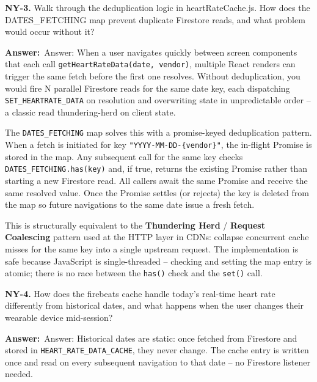\documentclass[letterpaper,10pt]{article}
\newlength{\boxwidth}
\newcommand{\answerlabel}{\noindent\textbf{\textcolor{answerblue}{Answer:}}~}
\begin{document}
\colorbox{qbg}{\begin{minipage}{\boxwidth}
\textbf{NY-3.} Walk through the deduplication logic in heartRateCache.js. How does the DATES\_FETCHING map prevent duplicate Firestore reads, and what problem would occur without it?
\end{minipage}}

\vspace{2pt}
\answerlabel{Answer:} When a user navigates quickly between screen components that each call \texttt{getHeartRateData(date, vendor)}, multiple React renders can trigger the same fetch before the first one resolves. Without deduplication, you would fire N parallel Firestore reads for the same date key, each dispatching \texttt{SET\_HEARTRATE\_DATA} on resolution and overwriting state in unpredictable order -- a classic read thundering-herd on client state.

The \texttt{DATES\_FETCHING} map solves this with a promise-keyed deduplication pattern. When a fetch is initiated for key \texttt{"YYYY-MM-DD-\{vendor\}"}, the in-flight Promise is stored in the map. Any subsequent call for the same key checks \texttt{DATES\_FETCHING.has(key)} and, if true, returns the existing Promise rather than starting a new Firestore read. All callers await the same Promise and receive the same resolved value. Once the Promise settles (or rejects) the key is deleted from the map so future navigations to the same date issue a fresh fetch.

This is structurally equivalent to the \textbf{Thundering Herd} / \textbf{Request Coalescing} pattern used at the HTTP layer in CDNs: collapse concurrent cache misses for the same key into a single upstream request. The implementation is safe because JavaScript is single-threaded -- checking and setting the map entry is atomic; there is no race between the \texttt{has()} check and the \texttt{set()} call.

\vspace{6pt}

\colorbox{qbg}{\begin{minipage}{\boxwidth}
\textbf{NY-4.} How does the firebeats cache handle today's real-time heart rate differently from historical dates, and what happens when the user changes their wearable device mid-session?
\end{minipage}}

\vspace{2pt}
\answerlabel{Answer:} Historical dates are static: once fetched from Firestore and stored in \texttt{HEART\_RATE\_DATA\_CACHE}, they never change. The cache entry is written once and read on every subsequent navigation to that date -- no Firestore listener needed.
\end{document}
